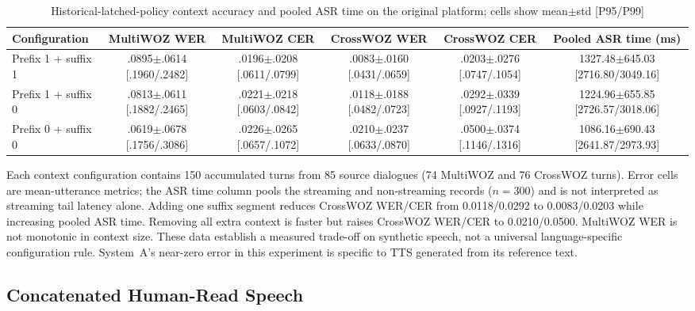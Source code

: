 \documentclass[conference]{IEEEtran}
\begin{document}
\begin{table}[!t]
\caption{Historical-latched-policy context accuracy and pooled ASR time on the original platform; cells show mean$\pm$std [P95/P99]}\label{tab:context}
\centering
\scriptsize
\setlength{\tabcolsep}{3pt}
\begin{tabular}{@{}lccccc@{}}
\toprule
Configuration & MultiWOZ WER & MultiWOZ CER & CrossWOZ WER & CrossWOZ CER & Pooled ASR time (ms) \\
\midrule
Prefix 1 + suffix 1 & .0895$\pm$.0614 [.1960/.2482] & .0196$\pm$.0208 [.0611/.0799] & .0083$\pm$.0160 [.0431/.0659] & .0203$\pm$.0276 [.0747/.1054] & 1327.48$\pm$645.03 [2716.80/3049.16] \\
Prefix 1 + suffix 0 & .0813$\pm$.0611 [.1882/.2465] & .0221$\pm$.0218 [.0603/.0842] & .0118$\pm$.0188 [.0482/.0723] & .0292$\pm$.0339 [.0927/.1193] & 1224.96$\pm$655.85 [2726.57/3018.06] \\
Prefix 0 + suffix 0 & .0619$\pm$.0678 [.1756/.3086] & .0226$\pm$.0265 [.0657/.1072] & .0210$\pm$.0237 [.0633/.0870] & .0500$\pm$.0374 [.1146/.1316] & 1086.16$\pm$690.43 [2641.87/2973.93] \\
\bottomrule
\end{tabular}
\end{table}

Each context configuration contains 150 accumulated turns from 85 source dialogues (74 MultiWOZ and 76 CrossWOZ turns). Error cells are mean-utterance metrics; the ASR time column pools the streaming and non-streaming records ($n=300$) and is not interpreted as streaming tail latency alone. Adding one suffix segment reduces CrossWOZ WER/CER from 0.0118/0.0292 to 0.0083/0.0203 while increasing pooled ASR time. Removing all extra context is faster but raises CrossWOZ WER/CER to 0.0210/0.0500. MultiWOZ WER is not monotonic in context size. These data establish a measured trade-off on synthetic speech, not a universal language-specific configuration rule. System~A's near-zero error in this experiment is specific to TTS generated from its reference text.

\subsection{Concatenated Human-Read Speech}\label{sec:realexp}
\end{document}
